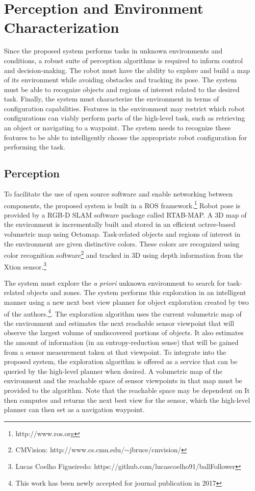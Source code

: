 \documentclass[conference]{IEEEtran}
\begin{document}
\section{Perception and Environment Characterization}
\label{sec:perception-and-env-characterization}
%
Since the proposed system performs tasks in unknown environments and conditions, a robust suite of perception algorithms is required to inform control and decision-making. The robot must have the ability to explore and build a map of its environment while avoiding obstacles and tracking its pose. The system must be able to recognize objects and regions of interest related to the desired task. Finally, the system must characterize the environment in terms of configuration capabilities. Features in the environment may restrict which robot configurations can viably perform parts of the high-level task, such as retrieving an object or navigating to a waypoint. The system needs to recognize these features to be able to intelligently choose the appropriate robot configuration for performing the task.

\subsection{Perception}
\label{sec:perception}
%
To facilitate the use of open source software and enable networking between components, the proposed system is built in a ROS framework.\footnote{http://www.ros.org} Robot pose is provided by a RGB-D SLAM software package called RTAB-MAP\cite{rtabmap}. A 3D map of the environment is incrementally built and stored in an efficient octree-based volumetric map using Octomap\cite{octomap}.  Task-related objects and regions of interest in the environment are given distinctive colors. These colors are recognized using color recognition software\footnote{CMVision: http://www.cs.cmu.edu/$\sim$jbruce/cmvision/} and tracked in 3D using depth information from the Xtion sensor.\footnote{Lucas Coelho Figueiredo: https://github.com/lucascoelho91/ballFollower}

The system must explore the \textit{a priori} unknown environment to search for task-related objects and zones. The system performs this exploration in an intelligent manner using a new next best view planner for object exploration created by two of the authors.\footnote{This work has been newly accepted for journal publication in 2017}. The exploration algorithm uses the current volumetric map of the environment and estimates the next reachable sensor viewpoint that will observe the largest volume of undiscovered portions of objects. It also estimates the amount of information (in an entropy-reduction sense) that will be gained from a sensor measurement taken at that viewpoint. To integrate into the proposed system, the exploration algorithm is offered as a service that can be queried by the high-level planner when desired. A volumetric map of the environment and the reachable space of sensor viewpoints in that map must be provided to the algorithm. Note that the reachable space may be dependent on It then computes and returns the next best view for the sensor, which the high-level planner can then set as a navigation waypoint.
\end{document}
